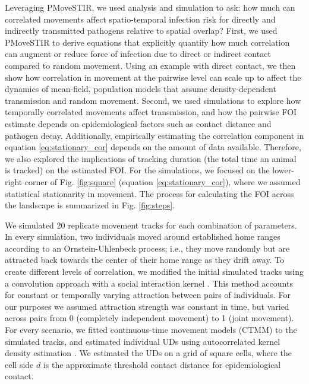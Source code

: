 \documentclass[letterpaper]{article}
\begin{document}
Leveraging PMoveSTIR, we used analysis and simulation to ask: how much can correlated movements affect spatio-temporal infection risk for directly and indirectly transmitted pathogens relative to spatial overlap? 
First, we used PMoveSTIR to derive equations that explicitly quantify how much correlation can augment or reduce force of infection due to direct or indirect contact compared to random movement. Using an example with direct contact, we then show how correlation in movement at the pairwise level can scale up to affect the dynamics of mean-field, population models that assume density-dependent transmission and random movement.
Second, we used simulations to explore how temporally correlated movements affect  transmission, and how the pairwise FOI estimate depends on epidemiological factors such as contact distance and pathogen decay. Additionally, empirically estimating the correlation component in equation \ref{eq:stationary_cor} depends on the amount of data available. Therefore, we also explored the implications of tracking duration (the total time an animal is tracked) on the estimated FOI. For the simulations, we focused on the lower-right corner of Fig. \ref{fig:square} (equation \ref{eq:stationary_cor}), where we assumed statistical stationarity in movement. The process for calculating the FOI across the landscape is summarized in Fig. \ref{fig:steps}.

We simulated 20 replicate movement tracks for each combination of parameters. In every simulation, two individuals moved around established home ranges according to an Ornstein-Uhlenbeck process; i.e., they move randomly but are attracted back towards the center of their home range as they drift away. To create different levels of correlation, we modified the initial simulated tracks using a convolution approach with a social interaction kernel \citep{Scharf2018}. This method accounts for constant or temporally varying attraction between pairs of individuals. For our purposes we assumed attraction strength was constant in time, but varied across pairs from 0 (completely independent movement) to 1 (joint movement). %
For every scenario, we fitted continuous-time movement models (CTMM) to the simulated tracks, and estimated individual UDs using autocorrelated kernel density estimation \citep[AKDE, ][]{Calabrese2016}. We estimated the UDs on a grid of square cells, where the cell side $d$ is the approximate threshold contact distance for epidemiological contact. 
\end{document}
